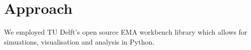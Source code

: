 \section{Approach}
\label{s:approach}



We employed TU Delft's open source EMA workbench library which allows for simuations, visualisation and analysis in Python.